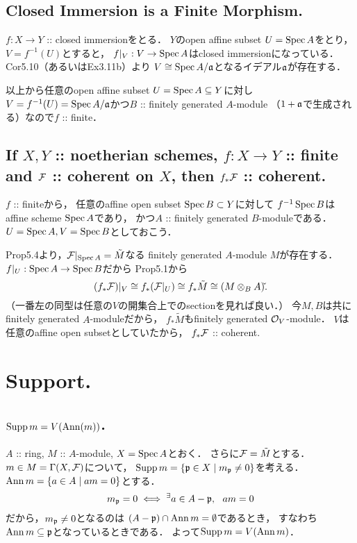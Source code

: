 \documentclass[a4paper]{jsarticle}
\begin{document}
    \subsection{Closed Immersion is a Finite Morphism.}
    $f: X \to Y$ :: closed immersionをとる．
    $Y$のopen affine subset $U=\operatorname{Spec} A$をとり，
    $V=f^{-1}(U)$とすると，
    $f|_V: V \to \operatorname{Spec} A$はclosed immersionになっている．
    Cor5.10（あるいはEx3.11b）より
    $V \cong \operatorname{Spec} A/\mathfrak{a}$となるイデアル$\mathfrak{a}$が存在する．

    以上から任意のopen affine subset $U=\operatorname{Spec} A \subseteq Y$に対し
    $V=f^{-1}(U)=\operatorname{Spec} A/\mathfrak{a}$かつ$B$ :: finitely generated $A$-module
    （$1+\mathfrak{a}$で生成される）なので$f$ :: finite．

    \subsection{If $X,Y$ :: noetherian schemes, $f: X \to Y$ :: finite and $\mathcal{F}$ :: coherent on $X$, then $f_*\mathcal{F}$ :: coherent.}
    $f$ :: finiteから，
    任意のaffine open subset $\operatorname{Spec} B \subset Y$に対して
    $f^{-1}\operatorname{Spec} B$はaffine scheme $\operatorname{Spec} A$であり，
    かつ$A$ :: finitely generated $B$-moduleである．
    $U=\operatorname{Spec} A, V=\operatorname{Spec} B$としておこう．

    Prop5.4より，$\mathcal{F}|_{\operatorname{Spec} A}=\tilde{M}$なる
    finitely generated $A$-module $M$が存在する．
    $f|_{U}: \operatorname{Spec} A \to \operatorname{Spec} B$だから
    Prop5.1から
    \[ (f_* \mathcal{F})|_V \cong f_* (\mathcal{F}|_U) \cong f_* \tilde{M} \cong (M \otimes_{B} A) \check{}. \]
    （一番左の同型は任意の$V$の開集合上でのsectionを見れば良い．）
    今$M,B$は共にfinitely generated $A$-moduleだから，
    $f_* \tilde{M}$もfinitely generated $\mathcal{O}_V$-module．
    $V$は任意のaffine open subsetとしていたから，
    $f_* \mathcal{F}$ :: coherent.

\section{Support.} %
    \subsection{$\operatorname{Supp} m=V(\operatorname{Ann}(m))$.}
    $A$ :: ring, $M$ :: $A$-module, $X=\operatorname{Spec} A$とおく．
    さらに$\mathcal{F}=\tilde{M}$とする．
    $m \in M=\Gamma(X,\mathcal{F})$について，
    $\operatorname{Supp} m=\{ \mathfrak{p} \in X \mid m_{\mathfrak{p}} \neq 0 \}$を考える．
    $\operatorname{Ann} m=\{a \in A \mid am=0 \}$とする．
    \[ m_{\mathfrak{p}}=0 \iff {}^{\exists} a \in A-\mathfrak{p},~~ am=0 \]
    だから，$m_{\mathfrak{p}} \neq 0$となるのは
    $(A-\mathfrak{p}) \cap \operatorname{Ann} m=\emptyset$であるとき，
    すなわち$\operatorname{Ann} m \subseteq \mathfrak{p}$となっているときである．
    よって$\operatorname{Supp} m=V(\operatorname{Ann} m)$．
\end{document}

